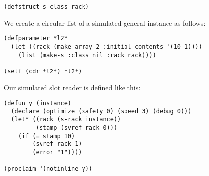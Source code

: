 \begin{verbatim}
(defstruct s class rack)
\end{verbatim}

We create a circular list of a simulated general instance as follows:

\begin{verbatim}
(defparameter *l2* 
  (let ((rack (make-array 2 :initial-contents '(10 1))))
    (list (make-s :class nil :rack rack))))

(setf (cdr *l2*) *l2*)
\end{verbatim}

Our simulated slot reader is defined like this:

\begin{verbatim}
(defun y (instance)
  (declare (optimize (safety 0) (speed 3) (debug 0)))
  (let* ((rack (s-rack instance))
         (stamp (svref rack 0)))
    (if (= stamp 10)
        (svref rack 1)
        (error "1"))))

(proclaim '(notinline y))
\end{verbatim}
